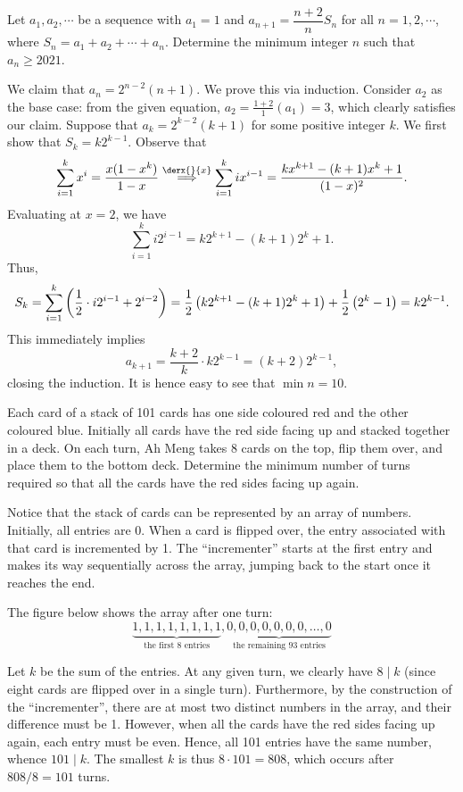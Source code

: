 \begin{question}[10]\label{A::2021-O-1-16}
    Let $a_1, a_2, \cdots$ be a sequence with $a_1 = 1$ and $a_{n+1} = \dfrac{n+2}{n} S_n$ for all $n = 1, 2, \cdots$, where $S_n = a_1 + a_2 + \cdots + a_n$. Determine the minimum integer $n$ such that $a_n \geq 2021$.
\end{question}
\begin{solution*}
    We claim that $a_n = 2^{n-2} (n+1)$. We prove this via induction. Consider $a_2$ as the base case: from the given equation, $a_2 = \frac{1+2}{1}(a_1) = 3$, which clearly satisfies our claim. Suppose that $a_k = 2^{k-2} (k+1)$ for some positive integer $k$. We first show that $S_k = k2^{k-1}$. Observe that \[\sum_{i=1}^k x^i = \frac{x(1-x^k)}{1-x} \overset{\derx{}{x}}{\implies} \sum_{i = 1}^k ix^{i-1} = \frac{kx^{k+1} - (k+1)x^k + 1}{(1-x)^2}.\] Evaluating at $x = 2$, we have \[\sum_{i = 1}^k i2^{i-1} = k2^{k+1} - (k+1)2^k +1.\] Thus, \[S_k = \sum_{i=1}^k \left( \frac12 \cdot i2^{i-1} + 2^{i-2} \right) = \frac12\left( k2^{k+1} - (k+1)2^k +1 \right) + \frac12 \left( 2^k - 1 \right) = k2^{k-1}.\] This immediately implies \[a_{k+1} = \frac{k+2}{k} \cdot k2^{k-1} = (k+2)2^{k-1},\] closing the induction. It is hence easy to see that $\min n = 10$.
\end{solution*}

\begin{question}[101]\label{A::2021-O-1-17}
    Each card of a stack of 101 cards has one side coloured red and the other coloured blue. Initially all cards have the red side facing up and stacked together in a deck. On each turn, Ah Meng takes 8 cards on the top, flip them over, and place them to the bottom deck. Determine the minimum number of turns required so that all the cards have the red sides facing up again.
\end{question}
\begin{solution*}
    Notice that the stack of cards can be represented by an array of numbers. Initially, all entries are 0. When a card is flipped over, the entry associated with that card is incremented by 1. The ``incrementer'' starts at the first entry and makes its way sequentially across the array, jumping back to the start once it reaches the end.

    The figure below shows the array after one turn: \[\underbrace{1,1,1,1,1,1,1,1}_{\text{the first 8 entries}},\underbrace{0,0,0,0,0,0,0,\ldots,0}_{\text{the remaining 93 entries}}\]
    
    Let $k$ be the sum of the entries. At any given turn, we clearly have $8 \mid k$ (since eight cards are flipped over in a single turn). Furthermore, by the construction of the ``incrementer'', there are at most two distinct numbers in the array, and their difference must be 1. However, when all the cards have the red sides facing up again, each entry must be even. Hence, all 101 entries have the same number, whence $101 \mid k$. The smallest $k$ is thus $8 \cdot 101 = 808$, which occurs after $808/8 = 101$ turns.
\end{solution*}

